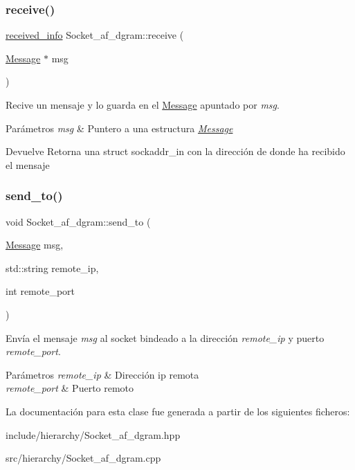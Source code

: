 \subsubsection{\texorpdfstring{receive()}{receive()}}
{\footnotesize\ttfamily \hyperlink{structreceived__info}{received\+\_\+info} Socket\+\_\+af\+\_\+dgram\+::receive (\begin{DoxyParamCaption}\item[{\hyperlink{structMessage}{Message} $\ast$}]{msg }\end{DoxyParamCaption})}



Recive un mensaje y lo guarda en el \hyperlink{structMessage}{Message} apuntado por {\itshape msg}. 


\begin{DoxyParams}{Parámetros}
{\em msg} & Puntero a una estructura {\itshape \hyperlink{structMessage}{Message}} \\
\hline
\end{DoxyParams}
\begin{DoxyReturn}{Devuelve}
Retorna una struct sockaddr\+\_\+in con la dirección de donde ha recibido el mensaje 
\end{DoxyReturn}
\mbox{\label{classSocket__af__dgram_a744bb661eeebe5b5cdfca0028da6bd88}} 
\subsubsection{\texorpdfstring{send\+\_\+to()}{send\_to()}}
{\footnotesize\ttfamily void Socket\+\_\+af\+\_\+dgram\+::send\+\_\+to (\begin{DoxyParamCaption}\item[{\hyperlink{structMessage}{Message}}]{msg,  }\item[{std\+::string}]{remote\+\_\+ip,  }\item[{int}]{remote\+\_\+port }\end{DoxyParamCaption})}



Envía el mensaje {\itshape msg} al socket bindeado a la dirección {\itshape remote\+\_\+ip} y puerto {\itshape remote\+\_\+port}. 


\begin{DoxyParams}{Parámetros}
{\em remote\+\_\+ip} & Dirección ip remota \\
\hline
{\em remote\+\_\+port} & Puerto remoto \\
\hline
\end{DoxyParams}


La documentación para esta clase fue generada a partir de los siguientes ficheros\+:\begin{DoxyCompactItemize}
\item 
include/hierarchy/Socket\+\_\+af\+\_\+dgram.\+hpp\item 
src/hierarchy/Socket\+\_\+af\+\_\+dgram.\+cpp\end{DoxyCompactItemize}
